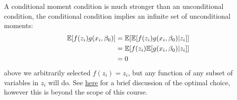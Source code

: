\documentclass[DIV=14,titlepage=false]{scrreprt}
\begin{document}
\begin{note}
    A conditional moment condition is much stronger than an unconditional condition, the conditional condition implies an infinite set of unconditional moments:
    \begin{align*}
        \mathbb{E}[f(z_i)g(x_i,\beta_0)]&=\mathbb{E}[\mathbb{E}[f(z_i)g(x_i,\beta_0)|z_i]]\\
        &=\mathbb{E}[f(z_i)\mathbb{E}[g(x_i,\beta_0)|z_i]]\\
        &=0
    \end{align*}  
    above we arbitrarily selected $f(z_i)=z_i$, but any function of any subset of variables in $z_i$ will do. See \href{https://eml.berkeley.edu/~powell/e241a_sp06/mmnotes.pdf}{here} for a brief discussion of the optimal choice, however this is beyond the scope of this course.
\end{note}
\end{document}
